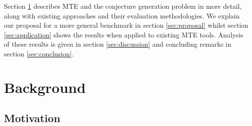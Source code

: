 Section \ref{sec:background} describes MTE and the conjecture generation problem
in more detail, along with existing approaches and their evaluation
methodologies. We explain our proposal for a more general benchmark in section
\ref{sec:proposal} whilst section \ref{sec:application} shows the results when
applied to existing MTE tools. Analysis of these results is given in section
\ref{sec:discussion} and concluding remarks in section \ref{sec:conclusion}.



\section{Background}
\label{sec:background}

\subsection{Motivation}
\label{sec:motivation}


